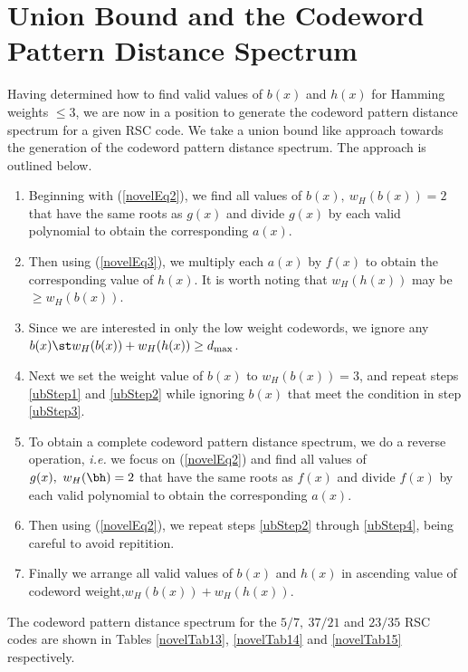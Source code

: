 \section{Union Bound and the Codeword Pattern Distance Spectrum}
\label{sec4}
Having determined how to find valid values of $b(x)$ and $h(x)$ for Hamming weights $\leq 3$, we are now in a position to generate the codeword pattern distance spectrum for a given RSC code. We take a union bound like approach towards the generation of the codeword pattern distance spectrum. The approach is outlined below.
\begin{enumerate}
 \item Beginning with (\ref{novelEq2}), we find all values of $b(x),~w_H(b(x))=2$ that have the same roots as $g(x)$ and divide $g(x)$ by each valid polynomial to obtain the corresponding $a(x)$.\label{ubStep1}
 \item Then using (\ref{novelEq3}), we multiply each $a(x)$ by $f(x)$ to obtain the corresponding value of $h(x)$. It is worth noting that $w_H(h(x))$ may be $\geq w_H(b(x))$. \label{ubStep2}
 \item Since we are interested in only the low weight codewords, we ignore any $b(x) \st w_H(b(x))+w_H(h(x)) \geq d_{\text{max}}$. \label{ubStep3}
 \item Next we set the weight value of $b(x)$ to $w_H(b(x))=3$, and repeat steps \ref{ubStep1} and \ref{ubStep2} while ignoring $b(x)$ that meet the condition in step \ref{ubStep3}.\label{ubStep4}
 \item To obtain a complete codeword pattern distance spectrum, we do a reverse operation, \textit{i.e.} we focus on (\ref{novelEq2}) and find all values of $g(x),~w_H(\bh)=2$ that have the same roots as $f(x)$ and divide $f(x)$ by each valid polynomial to obtain the corresponding $a(x)$.
 \item Then using (\ref{novelEq2}), we repeat steps \ref{ubStep2} through \ref{ubStep4}, being careful to avoid repitition.
 \item Finally we arrange all valid values of $b(x)$ and $h(x)$ in ascending value of codeword weight,$w_H(b(x)) + w_H(h(x))$.
 \end{enumerate}
The codeword pattern distance spectrum for the $5/7,~37/21$ and $23/35$ RSC codes are shown in Tables \ref{novelTab13},  \ref{novelTab14} and \ref{novelTab15} respectively.

